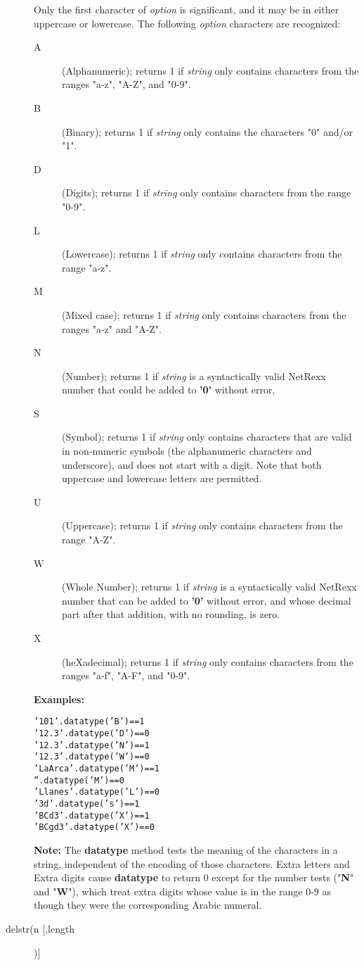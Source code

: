 \begin{description}
Only the first character of \emph{option} is significant, and it may
be in either uppercase or lowercase.
The following \emph{option} characters are recognized:
\begin{description}
\item[A]\label{refdta}
(Alphanumeric); returns 1 if \emph{string} only contains
characters from the ranges "a-z", "A-Z", and "0-9".
\item[B]\label{refdtb}
(Binary); returns 1 if \emph{string} only contains the
characters "0" and/or "1".
\item[D]\label{refdtd}
(Digits); returns 1 if \emph{string} only contains
characters from the range "0-9".
\item[L]\label{refdtl}
(Lowercase); returns 1 if \emph{string} only contains
characters from the range "a-z".
\item[M]\label{refdtm}
(Mixed case); returns 1 if \emph{string} only contains
characters from the ranges "a-z" and "A-Z".
\item[N]\label{refdtn}
(Number); returns 1 if \emph{string} is a syntactically valid
NetRexx number that could be added to \textbf{'0'} without error,
\item[S]\label{refdts}
(Symbol); returns 1 if \emph{string} only contains characters
that are valid in non-numeric symbols (the alphanumeric characters and
underscore), and does not start with a digit.  Note that both uppercase
and lowercase letters are permitted.
\item[U]\label{refdtu}
(Uppercase); returns 1 if \emph{string} only contains
characters from the range "A-Z".
\item[W]\label{refdtw}
(Whole Number); returns 1 if \emph{string} is a syntactically valid
NetRexx number that can be added to \textbf{'0'} without error, and
whose decimal part after that addition, with no rounding, is zero.
\item[X]\label{refdtx}
(heXadecimal); returns 1 if \emph{string} only contains
characters from the ranges "a-f", "A-F", and "0-9".
\end{description}
 \textbf{Examples:}
\begin{alltt}
'101'.datatype('B')    == 1
'12.3'.datatype('D')   == 0
'12.3'.datatype('N')   == 1
'12.3'.datatype('W')   == 0
'LaArca'.datatype('M') == 1
''.datatype('M')       == 0
'Llanes'.datatype('L') == 0
'3 d'.datatype('s')    == 1
'BCd3'.datatype('X')   == 1
'BCgd3'.datatype('X')  == 0
\end{alltt}
\textbf{Note: }The \textbf{datatype} method tests the meaning of the characters
in a string, independent of the encoding of those characters.  Extra
letters and Extra digits cause \textbf{datatype} to return 0 except
for the number tests ("\textbf{N}" and "\textbf{W}"),
which treat extra digits whose value is in the range 0-9 as though they
were the corresponding Arabic numeral.
\item[delstr(n [,length])]\label{refdelstr}


\end{description}
